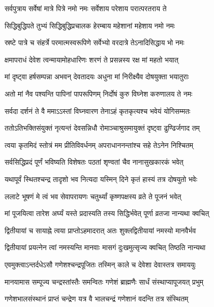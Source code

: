 \twolineshloka
{सर्वपुत्राय सर्वेषां मात्रे पित्रे नमो नमः}
{सर्वेशाय परेशाय परात्परतराय ते} %

\twolineshloka
{सिद्धिबुद्धिपते तुभ्यं सिद्धिबुद्धिप्रचालक}
{हेरम्बाय महेशानां महेशाय नमो नमः} %

\twolineshloka
{स्रष्टे पात्रे च संहर्त्रे परमात्मस्वरूपिणे}
{सर्वेभ्यो वरदात्रे तेऽनादिसिद्धाय भो नमः} %

\twolineshloka
{क्षमापराधं देवेश त्वन्मायामोहधारिणः}
{शरणं ते प्रसन्नस्य रक्ष मां महतो भयात्} %

\twolineshloka
{मां दृष्ट्वा हर्षसम्पन्ना अभवन् देवतादयः}
{अधुना मां निरीक्ष्यैव दोषयुक्ता भयातुराः} %

\twolineshloka
{अतो मां नैव पश्यन्ति पापिनां पापरूपिणम्}
{निर्दोषं कुरु विघ्नेश करुणालय ते नमः} %

\twolineshloka
{सर्वदा दर्शनं ते वै ममाऽऽस्तां विघ्नवारण}
{तेनाऽहं कृतकृत्यश्च भवेयं योगिसम्मतः} %

\twolineshloka
{ततोऽतिभक्तिसंयुक्तं नृत्यन्तं देवसन्निधौ}
{रोमाञ्चाश्रुसमायुक्तं दृष्ट्वा ढुण्ढिर्जगाद तम्} %


\twolineshloka
{त्वया कृतमिदं स्तोत्रं मम प्रीतिविवर्धनम्}
{अपराधाननन्तांश्च सहे तेऽनेन निश्चितम्} %

\twolineshloka
{सर्वसिद्धिप्रदं पूर्णं भविष्यति विशेषतः}
{पठतां श‍ृण्वतां चैव नानासुखकारकं भवेत्} %

\twolineshloka
{यथापूर्वं स्थितश्चन्द्र तादृशो भव नित्यदा}
{यस्मिन् दिने कृतं हास्यं तत्र दोषयुतो भवेः} %

\twolineshloka
{ललाटे भूषणं मे त्वं भव सेवापरायणः}
{चतुर्थ्यां कृष्णपक्षस्य व्रते ते पूजनं भवेत्} %

\twolineshloka
{मां पूजयित्वा तारेश अर्घ्यं यस्ते प्रदास्यति}
{तस्य सिद्धिर्भवेत् पूर्णा व्रतजा नान्यथा क्वचित्} %

\twolineshloka
{द्वितीयायां च सायाह्ने त्वया प्राप्तोऽहमादरात्}
{अतः शुक्लद्वितीयायां नमस्यो मानवैर्भव} %

\twolineshloka
{द्वितीयायां प्रयत्नेन त्वां नमस्यन्ति मानवाः}
{मासगं दुःखमुत्सृज्य क्वचित् तिष्ठति नान्यथा} %

\twolineshloka
{एवमुक्त्वाऽन्तर्दधेऽसौ गणेशश्चन्द्रपूजितः}
{तस्मिन् काले च देवेशा देवास्तत्र समाययुः} %

\twolineshloka
{मानयामास सम्पूज्य चन्द्रस्तांस्तैः समन्वितः}
{गणेशं ब्राह्मणैः सार्धं संस्थाप्यापूजयत् प्रभुम्} %

\twolineshloka
{गणेशभालसंस्थानं प्राप्तं चन्द्रेण यत्र वै}
{भालचन्द्रं गणेशानं वदन्ति तत्र संस्थितम्} %

